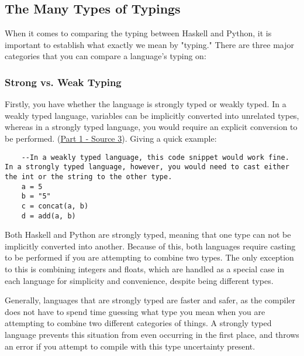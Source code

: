 \documentclass{article}
\begin{document}
    \subsection{The Many Types of Typings}
	
    When it comes to comparing the typing between Haskell and Python, it is important to establish what exactly we mean by "typing." There are three major categories that you can compare a language's typing on:
    \subsubsection{Strong vs. Weak Typing}
    Firstly, you have whether the language is strongly typed or weakly typed. In a weakly typed language, variables can be implicitly converted into unrelated types, whereas in a strongly typed language, you would require an explicit conversion to be performed. (\href{https://pythonconquerstheuniverse.wordpress.com/2009/10/03/static-vs-dynamic-typing-of-programming-languages/} {Part 1 - Source 3}). Giving a quick example:
    
    \begin{lstlisting}
    --In a weakly typed language, this code snippet would work fine. In a strongly typed language, however, you would need to cast either the int or the string to the other type. 
    a = 5
    b = "5"
    c = concat(a, b)
    d = add(a, b)
    \end{lstlisting}
    
    \medskip\noindent Both Haskell and Python are strongly typed, meaning that one type can not be implicitly converted into another. Because of this, both languages require casting to be performed if you are attempting to combine two types. The only exception to this is combining integers and floats, which are handled as a special case in each language for simplicity and convenience, despite being different types. 
    
    \medskip\noindent Generally, languages that are strongly typed are faster and safer, as the compiler does not have to spend time guessing what type you mean when you are attempting to combine two different categories of things. A strongly typed language prevents this situation from even occurring in the first place, and throws an error if you attempt to compile with this type uncertainty present. 
    
\end{document}
